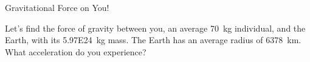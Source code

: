\documentclass[pdf, aspectratio=169]{beamer}
\begin{document}
\begin{frame}{Gravitational Force on You!}
  \begin{example}
	Let's find the force of gravity between you, an average \SI{70}{\kilo\gram} individual, and the Earth, with its \SI{5.97E24}{\kilo\gram} mass. The Earth has an average radius of \SI{6378}{\kilo\meter}. What acceleration do you experience?
	\onslide<2->{
	  \[F_g = (\SI{6.67E-11}{})\frac{(\SI{5.97E24}{})(70)}{(6378000)^2} = \SI{685.2}{\newton}\]
	}
	\onslide<3->{
	  \[F_g = ma = \SI{685.2}{\newton} = (70)a \quad\Rightarrow a = \SI{9.79}{\meter\per\second^2}\]
	}
  \end{example}
\end{frame}


\end{document}
